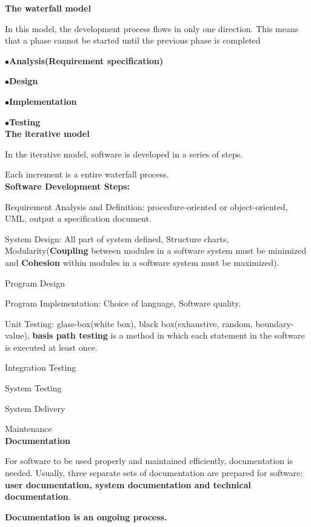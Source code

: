 \documentclass[]{report}
\begin{document}
\textbf{The waterfall model}

In this model, the development process flows in only one direction. This means that a phase cannot be started until the previous phase is completed

$\bullet$\textbf{Analysis(Requirement specification)}

$\bullet$\textbf{Design}

$\bullet$\textbf{Implementation}

$\bullet$\textbf{Testing}\\

\textbf{The iterative model}

In the iterative model, software is developed in a series of steps.

Each increment is a entire waterfall process.\\

\textbf{Software Development Steps: }

Requirement Analysis and Definition: procedure-oriented or object-oriented, UML, output a specification document.

System Design: All part of system defined, Structure charts, Modularity(\textbf{Coupling} between modules in a software system
must be minimized and \textbf{Cohesion} within modules in a software system
must be maximized).

Program Design

Program Implementation: Choice of language, Software quality.

Unit Testing: glass-box(white box), black box(exhaustive, random, boundary-value), \textbf{basis path testing} is a method in which each statement in the software is executed at least once.

Integration Testing

System Testing

System Delivery

Maintenance\\

\textbf{Documentation}

For software to be used properly and maintained efficiently, documentation is needed. Usually, three separate sets of documentation are prepared for software:  \textbf{user documentation, system documentation and   technical documentation}.

\textbf{Documentation is an ongoing process.}\\
\end{document}
